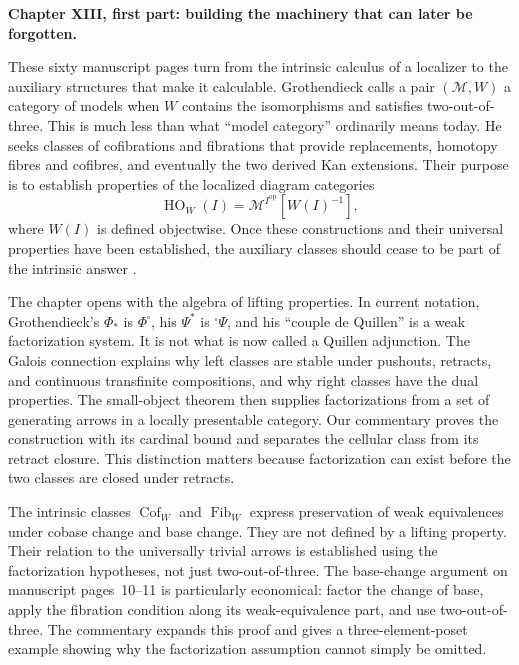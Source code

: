 \noindent\textbf{Chapter XIII, first part: building the machinery that can later be forgotten.}

These sixty manuscript pages turn from the intrinsic calculus of a
localizer to the auxiliary structures that make it calculable. Grothendieck
calls a pair $(\mathcal M,W)$ a category of models when $W$ contains the
isomorphisms and satisfies two-out-of-three. This is much less than what
``model category'' ordinarily means today. He seeks classes of cofibrations
and fibrations that provide replacements, homotopy fibres and cofibres, and
eventually the two derived Kan extensions. Their purpose is to establish
properties of the localized diagram categories
\[
 \operatorname{HO}_W(I)
   =\mathcal M^{I^{\mathrm{op}}}[W(I)^{-1}],
\]
where $W(I)$ is defined objectwise. Once these constructions and their
universal properties have been established, the auxiliary classes should
cease to be part of the intrinsic answer
\citep[manuscript pp.~12--14]{Grothendieck1990XIII}.

The chapter opens with the algebra of lifting properties. In current
notation, Grothendieck's $\Phi_*$ is $\Phi^{\square}$, his $\Psi^*$ is
${}^{\square}\Psi$, and his ``couple de Quillen'' is a weak factorization
system. It is not what is now called a Quillen adjunction. The Galois
connection explains why left classes are stable under pushouts, retracts,
and continuous transfinite compositions, and why right classes have the
dual properties. The small-object theorem then supplies factorizations
from a set of generating arrows in a locally presentable category. Our
commentary proves the construction with its cardinal bound and separates
the cellular class from its retract closure. This distinction matters
because factorization can exist before the two classes are closed under
retracts.

The intrinsic classes $\operatorname{Cof}_W$ and
$\operatorname{Fib}_W$ express preservation of weak equivalences under
cobase change and base change. They are not defined by a lifting property.
Their relation to the universally trivial arrows is established using the
factorization hypotheses, not just two-out-of-three. The base-change
argument on manuscript pages~10--11 is particularly economical: factor the
change of base, apply the fibration condition along its weak-equivalence
part, and use two-out-of-three. The commentary expands this proof and gives
a three-element-poset example showing why the factorization assumption
cannot simply be omitted.

